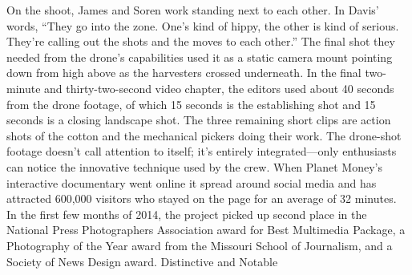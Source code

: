 On the shoot, James and Soren work standing next to each other. In Davis'
words, ``They go into the zone. One's kind of hippy, the other is kind of serious.
They're calling out the shots and the moves to each other.'' The final shot
they needed from the drone's capabilities used it as a static camera mount
pointing down from high above as the harvesters crossed underneath.
In the final two-minute and thirty-two-second video chapter, the editors
used about 40 seconds from the drone footage, of which 15 seconds is the
establishing shot and 15 seconds is a closing landscape shot. The three
remaining short clips are action shots of the cotton and the mechanical
pickers doing their work. The drone-shot footage doesn't call attention to
itself; it's entirely integrated—only enthusiasts can notice the innovative
technique used by the crew.
When Planet Money's interactive documentary went online it spread around
social media and has attracted 600,000 visitors who stayed on the page for
an average of 32 minutes. In the first few months of 2014, the project picked
up second place in the National Press Photographers Association award for
Best Multimedia Package, a Photography of the Year award from the Missouri
School of Journalism, and a Society of News Design award.
Distinctive and Notable

